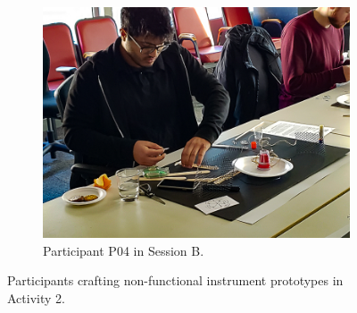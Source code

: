 \documentclass[letterpaper, 12pt]{article}
\begin{document}
\begin{figure}[t]
\begin{subfigure}[]{0.4\textwidth}
        \centering
        \includegraphics[width=1\textwidth]{ch3_dfp_nfp_B_P4.jpg}
        \caption{Participant P04 in Session B.}
    \end{subfigure}
    \caption[Design for Performance workshop: Activity 2 - Non-functional prototyping]{Participants crafting non-functional instrument prototypes in Activity 2.}
    \label{ch3-fig:instrument-building}
\end{figure}


\end{document}
